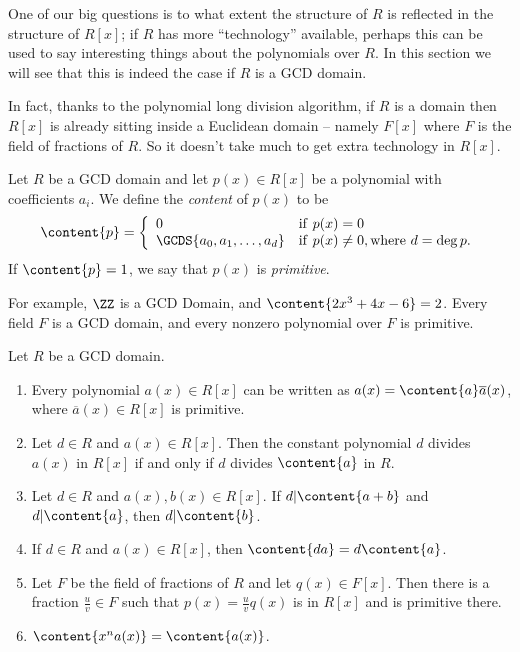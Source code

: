 \documentclass{article}
\begin{document}

One of our big questions is to what extent the structure of $R$ is reflected in the structure of $R[x]$; if $R$ has more ``technology'' available, perhaps this can be used to say interesting things about the polynomials over $R$. In this section we will see that this is indeed the case if $R$ is a GCD domain.

In fact, thanks to the polynomial long division algorithm, if $R$ is a domain then $R[x]$ is already sitting inside a Euclidean domain -- namely $F[x]$ where $F$ is the field of fractions of $R$. So it doesn't take much to get extra technology in $R[x]$.

\begin{dfn}
Let $R$ be a GCD domain and let $p(x) \in R[x]$ be a polynomial with coefficients $a_i$. We define the \emph{content} of $p(x)$ to be \[ \content{p} = \left\{ \begin{array}{ll} 0 & \mathrm{if}\ p(x) = 0 \\ \GCDS{a_0,a_1,\ldots,a_d} & \mathrm{if}\ p(x) \neq 0, \mathrm{where}\ d = \deg{p}. \end{array} \right. \] If $\content{p} = 1$, we say that $p(x)$ is \emph{primitive}.
\end{dfn}

For example, $\ZZ$ is a GCD Domain, and $\content{2x^3 + 4x - 6} = 2$. Every field $F$ is a GCD domain, and every nonzero polynomial over $F$ is primitive.

\begin{prop}
Let $R$ be a GCD domain.
\begin{enumerate}
\item Every polynomial $a(x) \in R[x]$ can be written as $a(x) = \content{a} \overline{a}(x)$, where $\overline{a}(x) \in R[x]$ is primitive.
\item Let $d \in R$ and $a(x) \in R[x]$. Then the constant polynomial $d$ divides $a(x)$ in $R[x]$ if and only if $d$ divides $\content{a}$ in $R$.
\item Let $d \in R$ and $a(x), b(x) \in R[x]$. If $d|\content{a+b}$ and $d|\content{a}$, then $d|\content{b}$.
\item If $d \in R$ and $a(x) \in R[x]$, then $\content{da} = d\content{a}$.
\item Let $F$ be the field of fractions of $R$ and let $q(x) \in F[x]$. Then there is a fraction $\frac{u}{v} \in F$ such that $p(x) = \frac{u}{v}q(x)$ is in $R[x]$ and is primitive there.

\item $\content{x^n a(x)} = \content{a(x)}$.
\end{enumerate}
\end{prop}
\end{document}
